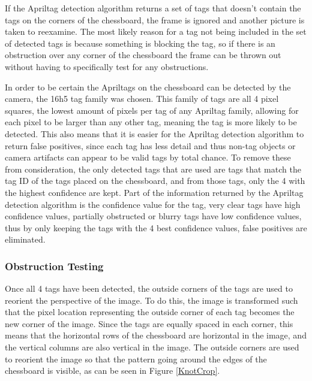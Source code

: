 \documentclass[journal]{IEEEtran}
\begin{document}
If the Apriltag detection algorithm returns a set of tags that doesn't contain the tags on the corners of the chessboard, the frame is ignored and another picture is taken to reexamine. The most likely reason for a tag not being included in the set of detected tags is because something is blocking the tag, so if there is an obstruction over any corner of the chessboard the frame can be thrown out without having to specifically test for any obstructions.

In order to be certain the Apriltags on the chessboard can be detected by the camera, the 16h5 tag family was chosen. This family of tags are all 4 pixel squares, the lowest amount of pixels per tag of any Apriltag family, allowing for each pixel to be larger than any other tag, meaning the tag is more likely to be detected.
This also means that it is easier for the Apriltag detection algorithm to return false positives, since each tag has less detail and thus non-tag objects or camera artifacts can appear to be valid tags by total chance. To remove these from consideration, the only detected tags that are used are tags that match the tag ID of the tags placed on the chessboard, and from those tags, only the 4 with the highest confidence are kept. Part of the information returned by the Apriltag detection algorithm is the confidence value for the tag, very clear tags have high confidence values, partially obstructed or blurry tags have low confidence values, thus by only keeping the tags with the 4 best confidence values, false positives are eliminated.

\vspace{12pt}

\subsubsection{Obstruction Testing}

Once all 4 tags have been detected, the outside corners of the tags are used to reorient the perspective of the image. To do this, the image is transformed such that the pixel location representing the outside corner of each tag becomes the new corner of the image. Since the tags are equally spaced in each corner, this means that the horizontal rows of the chessboard are horizontal in the image, and the vertical columns are also vertical in the image. The outside corners are used to reorient the image so that the pattern going around the edges of the chessboard is visible, as can be seen in Figure \ref{KnotCrop}. 
\end{document}
